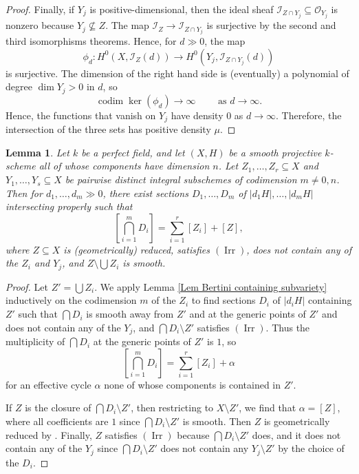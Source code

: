 \documentclass[11pt]{amsart}
\newtheorem{Lemma}[Thm]{Lemma}
\theoremstyle{definition}
\newcommand{\codim}{\operatorname{codim}}
\newcommand{\Irr}{\operatorname{Irr}}
\begin{document}
\begin{proof}
Finally, if $Y_j$ is positive-dimensional, then the ideal sheaf
$\mathcal I_{Z \cap Y_j} \subseteq \mathcal O_{Y_j}$ is nonzero
because $Y_j \not\subseteq Z$. The map $\mathcal I_Z \to \mathcal
I_{Z \cap Y_j}$ is surjective by the second and third isomorphisms
theorems.
Hence, for $d \gg 0$, the map
\[
\phi_d \colon H^0(X,\mathcal I_Z(d)) \to H^0(Y_j,\mathcal I_{Z \cap
Y_j}(d))
\]
is surjective. The dimension of the right hand side is (eventually)
a polynomial of degree $\dim Y_j > 0$ in $d$, so
\[
\codim \ker (\phi_d) \to \infty \hspace{2em}\text{ as } d \to
\infty.
\]
Hence, the functions that vanish on $Y_j$ have density $0$ as $d \to
\infty$. Therefore, the intersection of the three sets has positive
density $\mu$.
\end{proof}

\begin{Lemma}\label{Lem Bertini linkage}
Let $k$ be a perfect field, and let $(X,H)$ be a smooth projective
$k$-scheme all of whose components have dimension $n$. Let $Z_1,
\ldots, Z_r \subseteq X$ and $Y_1,\ldots, Y_s \subseteq X$ be
pairwise distinct integral subschemes of codimension $m \neq 0,n$.
%
Then for $d_1,\ldots,d_m \gg 0$, there exist sections
$D_1,\ldots,D_m$ of $|d_1H|,\ldots,|d_mH|$ intersecting properly
such that \vspace{-.3em}
\[
\left[\bigcap_{i=1}^m D_i\right] = \sum_{i = 1}^r [Z_i] + [Z],
\]
where $Z \subseteq X$ is (geometrically) reduced, satisfies
$(\Irr)$, does not contain any of the $Z_i$ and $Y_j$, and $Z
\setminus \bigcup Z_i$ is smooth.
\end{Lemma}

\begin{proof}
Let $Z' = \bigcup Z_i$. We apply Lemma \ref{Lem Bertini containing
subvariety} inductively on the codimension $m$ of the $Z_i$ to find
sections $D_i$ of $|d_iH|$ containing $Z'$ such that $\bigcap D_i$
is smooth away from $Z'$ and at the generic points of $Z'$ and does
not contain any of the $Y_j$, and $\bigcap D_i \setminus Z'$
satisfies $(\Irr)$. Thus the multiplicity of $\bigcap D_i$ at the
generic points of $Z'$ is $1$, so
\[
\left[\bigcap_{i=1}^m D_i\right] = \sum_{i = 1}^r [Z_i] + \alpha
\]
for an effective cycle $\alpha$ none of whose components is
contained in $Z'$.

If $Z$ is the closure of $\bigcap D_i \setminus Z'$, then
restricting to $X \setminus Z'$, we find that $\alpha = [Z]$, where
all coefficients are $1$ since $\bigcap D_i \setminus Z'$ is smooth.
Then $Z$ is geometrically reduced by \cite[Tag
\href{https://stacks.math.columbia.edu/tag/020I}{020I}]{Stacks}.
Finally, $Z$ satisfies $(\Irr)$ because $\bigcap D_i \setminus Z'$
does, and it does not contain any of the $Y_j$ since $\bigcap D_i
\setminus Z'$ does not contain any $Y_j \setminus Z'$ by the choice
of the $D_i$.
\end{proof}
\end{document}
